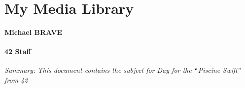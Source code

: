\documentclass[12pt]{report}
\begin{document}
\vspace{\baselineskip}

\vspace{\baselineskip}

\vspace{\baselineskip}

\vspace{\baselineskip}

\vspace{\baselineskip}
\par

\section*{My Media Library}

\vspace{\baselineskip}

\vspace{\baselineskip}
\paragraph*{Michael BRAVE }
\paragraph*{42 Staff }

\vspace{\baselineskip}

\vspace{\baselineskip}

\vspace{\baselineskip}

\vspace{\baselineskip}
\begin{Center}
\textit{Summary: This document contains the subject for Day for the $``$Piscine Swift$"$  from 42}
\end{Center}\par


\vspace{\baselineskip}

\vspace{\baselineskip}

\vspace{\baselineskip}

\vspace{\baselineskip}

\vspace{\baselineskip}
\end{document}
